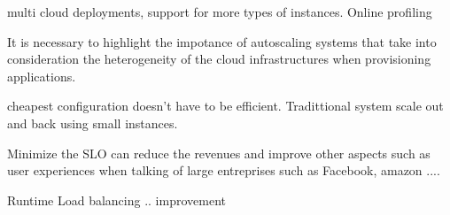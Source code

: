 multi cloud deployments, support for more types of instances.
Online profiling

It is necessary to highlight the impotance of autoscaling systems that take into consideration the heterogeneity of the cloud infrastructures when provisioning applications.

cheapest configuration doesn't have to be efficient. Tradittional system scale out and back using small instances.

Minimize the SLO can reduce the revenues and improve other aspects such as user experiences when talking of large entreprises such as Facebook, amazon ....

Runtime Load balancing .. improvement
